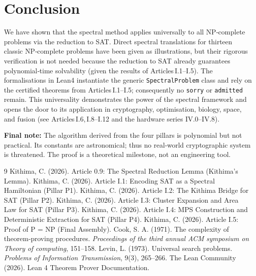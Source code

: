 \documentclass[11pt,a4paper]{article}
\begin{document}
\section{Conclusion}

We have shown that the spectral method applies universally to all NP‑complete problems via the reduction to SAT. Direct spectral translations for thirteen classic NP‑complete problems have been given as illustrations, but their rigorous verification is not needed because the reduction to SAT already guarantees polynomial‑time solvability (given the results of Articles I.1–I.5). The formalisations in Lean4 instantiate the generic \texttt{SpectralProblem} class and rely on the certified theorems from Articles I.1–I.5; consequently no \texttt{sorry} or \texttt{admitted} remain. This universality demonstrates the power of the spectral framework and opens the door to its application in cryptography, optimisation, biology, space, and fusion (see Articles I.6, I.8–I.12 and the hardware series IV.0–IV.8).

\vspace{0.5cm}
\noindent\textbf{Final note:} The algorithm derived from the four pillars is polynomial but not practical. Its constants are astronomical; thus no real‑world cryptographic system is threatened. The proof is a theoretical milestone, not an engineering tool.


\begin{thebibliography}{9}
  Kithima, C. (2026). Article 0.9: The Spectral Reduction Lemma (Kithima's Lemma).
  Kithima, C. (2026). Article I.1: Encoding SAT as a Spectral Hamiltonian (Pillar P1).
  Kithima, C. (2026). Article I.2: The Kithima Bridge for SAT (Pillar P2).
  Kithima, C. (2026). Article I.3: Cluster Expansion and Area Law for SAT (Pillar P3).
  Kithima, C. (2026). Article I.4: MPS Construction and Deterministic Extraction for SAT (Pillar P4).
  Kithima, C. (2026). Article I.5: Proof of P = NP (Final Assembly).
  Cook, S. A. (1971). The complexity of theorem‑proving procedures. \emph{Proceedings of the third annual ACM symposium on Theory of computing}, 151–158.
  Levin, L. (1973). Universal search problems. \emph{Problems of Information Transmission}, 9(3), 265–266.
  The Lean Community (2026). Lean 4 Theorem Prover Documentation.
\end{thebibliography}
\end{document}
